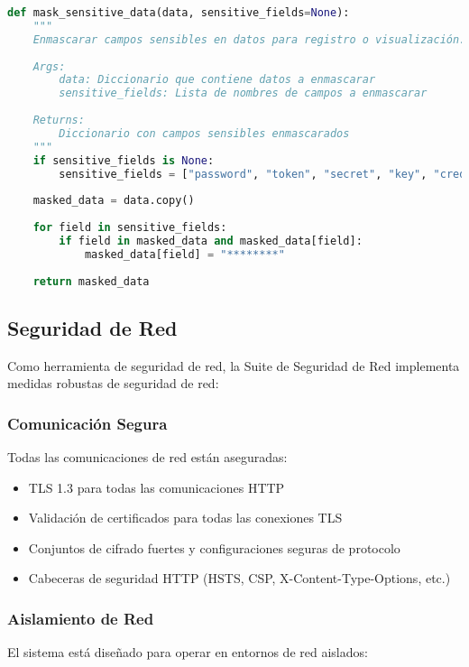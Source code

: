 \begin{lstlisting}[language=python, caption=Ejemplo de Enmascaramiento de Datos Sensibles]
def mask_sensitive_data(data, sensitive_fields=None):
    """
    Enmascarar campos sensibles en datos para registro o visualización.
    
    Args:
        data: Diccionario que contiene datos a enmascarar
        sensitive_fields: Lista de nombres de campos a enmascarar
        
    Returns:
        Diccionario con campos sensibles enmascarados
    """
    if sensitive_fields is None:
        sensitive_fields = ["password", "token", "secret", "key", "credential"]
        
    masked_data = data.copy()
    
    for field in sensitive_fields:
        if field in masked_data and masked_data[field]:
            masked_data[field] = "********"
            
    return masked_data
\end{lstlisting}

\subsection{Seguridad de Red}
Como herramienta de seguridad de red, la Suite de Seguridad de Red implementa medidas robustas de seguridad de red:

\subsubsection{Comunicación Segura}
Todas las comunicaciones de red están aseguradas:

\begin{itemize}
    \item TLS 1.3 para todas las comunicaciones HTTP
    \item Validación de certificados para todas las conexiones TLS
    \item Conjuntos de cifrado fuertes y configuraciones seguras de protocolo
    \item Cabeceras de seguridad HTTP (HSTS, CSP, X-Content-Type-Options, etc.)
\end{itemize}

\subsubsection{Aislamiento de Red}
El sistema está diseñado para operar en entornos de red aislados:

